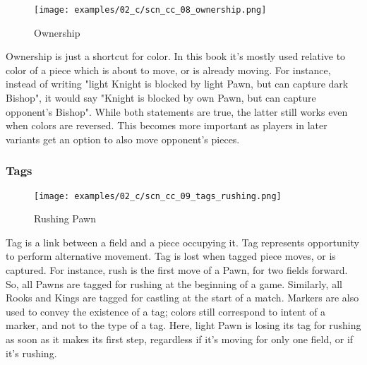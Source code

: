 \vspace*{-0.7\baselineskip}
\noindent
\begin{wrapfigure}[15]{l}{0.4\textwidth}
\centering
\texttt{[image: examples/02\_c/scn\_cc\_08\_ownership.png]}
\vspace*{-1.4\baselineskip}
\caption{Ownership}
\label{fig:scn_cc_08_ownership}
\end{wrapfigure}
Ownership is just a shortcut for color. In this book it's mostly used relative
to color of a piece which is about to move, or is already moving. \newline
\indent
For instance, instead of writing "light Knight is blocked by light Pawn, but can
capture dark Bishop", it would say "Knight is blocked by own Pawn, but can capture
opponent's Bishop". While both statements are true, the latter still works even
when colors are reversed. This becomes more important as players in later variants
get an option to also move opponent's pieces.

\clearpage %

\subsubsection*{Tags}
\label{sec:Classical Chess/Chessboard/Examples/Tags}

\vspace*{-0.7\baselineskip}
\noindent
\begin{wrapfigure}[16]{l}{0.4\textwidth}
\centering
\texttt{[image: examples/02\_c/scn\_cc\_09\_tags\_rushing.png]}
\vspace*{-1.4\baselineskip}
\caption{Rushing Pawn}
\label{fig:scn_cc_09_tags_rushing}
\end{wrapfigure}
Tag is a link between a field and a piece occupying it. Tag represents
opportunity to perform alternative movement. Tag is lost when tagged
piece moves, or is captured. \newline
\indent
For instance, rush is the first move of a Pawn, for two fields forward.
So, all Pawns are tagged for rushing at the beginning of a game. Similarly,
all Rooks and Kings are tagged for castling at the start of a match. \newline
\indent
Markers are also used to convey the existence of a tag; colors still
correspond to intent of a marker, and not to the type of a tag. \newline
\indent
Here, light Pawn is losing its tag for rushing as soon as it makes its
first step, regardless if it's moving for only one field, or if it's
rushing.

